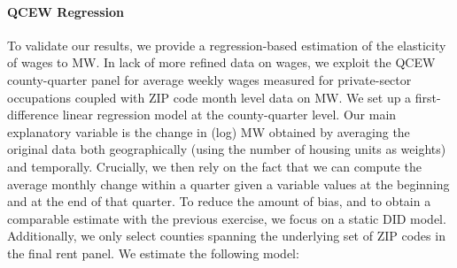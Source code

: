 %
%
%
%
%
%
%

\paragraph{QCEW Regression} To validate our results, we provide a 
regression-based estimation of the elasticity of wages to MW. In lack of more refined data on wages, 
we exploit the QCEW county-quarter panel for average weekly wages measured for private-sector occupations
coupled with ZIP code month level data on MW. We set up a first-difference linear regression model at the 
county-quarter level. Our main explanatory variable is the change in (log) MW obtained by averaging the 
original data both geographically (using the number of housing units as weights) and temporally. 
Crucially, we then rely on the fact that we can compute the average monthly change within a quarter
given a variable values at the beginning and at the end of that quarter. To reduce the amount of bias, and to obtain 
a comparable estimate with the previous exercise, we focus on a static DID model. Additionally, we only 
select counties spanning the underlying set of ZIP codes in the final rent panel. We estimate the following model: 

